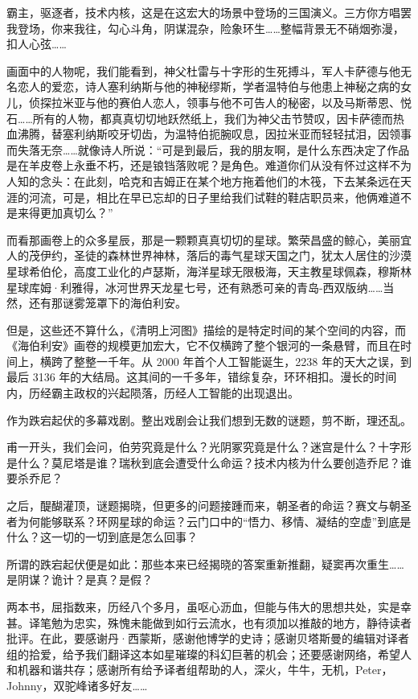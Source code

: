 \documentclass[AutoFakeBold=true]{book}
\begin{document}
霸主，驱逐者，技术内核，这是在这宏大的场景中登场的三国演义。三方你方唱罢我登场，你来我往，勾心斗角，阴谋混杂，险象环生……整幅背景无不硝烟弥漫，扣人心弦……

画面中的人物呢，我们能看到，神父杜雷与十字形的生死搏斗，军人卡萨德与他无名恋人的爱恋，诗人塞利纳斯与他的神秘缪斯，学者温特伯与他患上神秘之病的女儿，侦探拉米亚与他的赛伯人恋人，领事与他不可告人的秘密，以及马斯蒂恩、悦石……所有的人物，都真真切切地跃然纸上，我们为神父击节赞叹，因卡萨德而热血沸腾，替塞利纳斯咬牙切齿，为温特伯扼腕叹息，因拉米亚而轻轻拭泪，因领事而失落无奈……就像诗人所说：``可是到最后，我的朋友啊，是什么东西决定了作品是在羊皮卷上永垂不朽，还是锒铛落败呢？是角色。难道你们从没有怀过这样不为人知的念头：在此刻，哈克和吉姆正在某个地方拖着他们的木筏，下去某条远在天涯的河流，可是，相比在早已忘却的日子里给我们试鞋的鞋店职员来，他俩难道不是来得更加真切么？''

而看那画卷上的众多星辰，那是一颗颗真真切切的星球。繁荣昌盛的鲸心，美丽宜人的茂伊约，圣徒的森林世界神林，落后的毒气星球天国之门，犹太人居住的沙漠星球希伯伦，高度工业化的卢瑟斯，海洋星球无限极海，天主教星球佩森，穆斯林星球库姆·利雅得，冰河世界天龙星七号，还有熟悉可亲的青岛-西双版纳……当然，还有那谜雾笼罩下的海伯利安。

但是，这些还不算什么，《清明上河图》描绘的是特定时间的某个空间的内容，而《海伯利安》画卷的规模更加宏大，它不仅横跨了整个银河的一条悬臂，而且在时间上，横跨了整整一千年。从 2000 年首个人工智能诞生，2238 年的天大之误，到最后 3136 年的大结局。这其间的一千多年，错综复杂，环环相扣。漫长的时间内，历经霸主政权的兴起陨落，历经人工智能的出现退出。

作为跌宕起伏的多幕戏剧。整出戏剧会让我们想到无数的谜题，剪不断，理还乱。

甫一开头，我们会问，伯劳究竟是什么？光阴冢究竟是什么？迷宫是什么？十字形是什么？莫尼塔是谁？瑞秋到底会遭受什么命运？技术内核为什么要创造乔尼？谁要杀乔尼？

之后，醍醐灌顶，谜题揭晓，但更多的问题接踵而来，朝圣者的命运？赛文与朝圣者为何能够联系？环网星球的命运？云门口中的``悟力、移情、凝结的空虚''到底是什么？这一切的一切到底是怎么回事？

所谓的跌宕起伏便是如此：那些本来已经揭晓的答案重新推翻，疑窦再次重生……是阴谋？诡计？是真？是假？

两本书，屈指数来，历经八个多月，虽呕心沥血，但能与伟大的思想共处，实是幸甚。译笔勉为忠实，殊愧未能做到如行云流水，也有须加以推敲的地方，静待读者批评。在此，要感谢丹·西蒙斯，感谢他博学的史诗；感谢贝塔斯曼的编辑对译者组的拾爱，给予我们翻译这本如星璀璨的科幻巨著的机会；还要感谢网络，希望人和机器和谐共存；感谢所有给予译者组帮助的人，深火，牛牛，无机，Peter，Johnny，双驼峰诸多好友……
\end{document}
